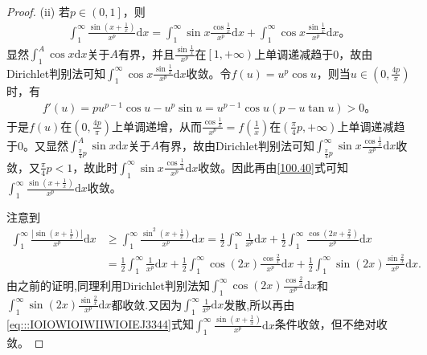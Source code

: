 \documentclass[../../main.tex]{subfiles}%
\begin{document}
\begin{proof}
(ii) 若\(p\in \left( 0,1 \right]\)，则
\begin{align}
\int_1^{\infty}{\frac{\sin \left( x+\frac{1}{x} \right)}{x^p}\mathrm{d}x}=\int_1^{\infty}{\sin x\frac{\cos \frac{1}{x}}{x^p}\mathrm{d}x}+\int_1^{\infty}{\cos x\frac{\sin \frac{1}{x}}{x^p}\mathrm{d}x}。\label{100.40}
\end{align}
显然\(\int_1^A{\cos x\mathrm{d}x}\)关于\(A\)有界，并且\(\frac{\sin \frac{1}{x}}{x^p}\)在\(\left[ 1,+\infty \right)\)上单调递减趋于0，故由Dirichlet判别法可知\(\int_1^{\infty}{\cos x\frac{\sin \frac{1}{x}}{x^p}\mathrm{d}x}\)收敛。令\(f\left( u \right) =u^p\cos u\)，则当\(u\in \left( 0,\frac{4p}{\pi} \right)\)时，有
\begin{align*}
f'\left( u \right) =pu^{p-1}\cos u-u^p\sin u=u^{p-1}\cos u\left( p-u\tan u \right) >0。
\end{align*}
于是\(f\left( u \right)\)在\(\left( 0,\frac{4p}{\pi} \right)\)上单调递增，从而\(\frac{\cos \frac{1}{x}}{x^p}=f\left( \frac{1}{x} \right)\)在\(\left( \frac{\pi}{4}p,+\infty \right)\)上单调递减趋于0。又显然\(\int_{\frac{\pi}{4}p}^A{\sin x\mathrm{d}x}\)关于\(A\)有界，故由Dirichlet判别法可知\(\int_{\frac{\pi}{4}p}^{\infty}{\sin x\frac{\cos \frac{1}{x}}{x^p}\mathrm{d}x}\)收敛，又\(\frac{\pi}{4}p<1\)，故此时\(\int_1^{\infty}{\sin x\frac{\cos \frac{1}{x}}{x^p}\mathrm{d}x}\)收敛。因此再由\eqref{100.40}式可知\(\int_1^{\infty}{\frac{\sin \left( x+\frac{1}{x} \right)}{x^p}\mathrm{d}x}\)收敛。

注意到
\begin{align}
\int_1^{\infty}{\frac{\left| \sin \left( x+\frac{1}{x} \right) \right|}{x^p}\mathrm{d}x}&\geqslant \int_1^{\infty}{\frac{\sin ^2\left( x+\frac{1}{x} \right)}{x^p}\mathrm{d}x}=\frac{1}{2}\int_1^{\infty}{\frac{1}{x^p}\mathrm{d}x}+\frac{1}{2}\int_1^{\infty}{\frac{\cos \left( 2x+\frac{2}{x} \right)}{x^p}\mathrm{d}x}\nonumber
\\
&=\frac{1}{2}\int_1^{\infty}{\frac{1}{x^p}\mathrm{d}x}+\frac{1}{2}\int_1^{\infty}{\cos \left( 2x \right) \frac{\cos \frac{2}{x}}{x^p}\mathrm{d}x}+\frac{1}{2}\int_1^{\infty}{\sin \left( 2x \right) \frac{\sin \frac{2}{x}}{x^p}\mathrm{d}x}.\label{eq:::IOIOWIOIWIIWIOIEJ3344}
\end{align}
由之前的证明,同理利用Dirichlet判别法知$\int_1^{\infty}{\cos \left( 2x \right) \frac{\cos \frac{2}{x}}{x^p}\mathrm{d}x}$和$\int_1^{\infty}{\sin \left( 2x \right) \frac{\sin \frac{2}{x}}{x^p}\mathrm{d}x}$都收敛.又因为\(\int_1^{\infty}{\frac{1}{x^p}\mathrm{d}x}\)发散,所以再由\eqref{eq:::IOIOWIOIWIIWIOIEJ3344}式知\(\int_1^{\infty}{\frac{\sin \left( x+\frac{1}{x} \right)}{x^p}\mathrm{d}x}\)条件收敛，但不绝对收敛。


\end{proof}
\end{document}
